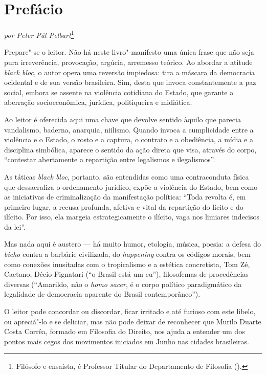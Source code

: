 \chapter{Prefácio}

\begin{flushright}
\emph{por Peter Pál Pelbart}\footnote{Filósofo e ensaísta, é
Professor Titular do Departamento de Filosofia ().}
\end{flushright}

Prepare"-se o leitor. Não há neste livro"-manifesto uma única frase que
não seja pura irreverência, provocação, argúcia, arremesso teórico. Ao
abordar a atitude \emph{black bloc}, o autor opera uma reversão
impiedosa: tira a máscara da democracia ocidental e de sua versão
brasileira. Sim, desta que invoca constantemente a paz social, embora se
assente na violência cotidiana do Estado, que garante a aberração
socioeconômica, jurídica, politiqueira e midiática.

Ao leitor é oferecida aqui uma chave que devolve sentido àquilo que
parecia vandalismo, baderna, anarquia, niilismo. Quando invoca a
cumplicidade entre a violência e o Estado, o rosto e a captura, o
contrato e a obediência, a mídia e a disciplina simbólica, aparece o
sentido da ação direta que visa, através do corpo, ``contestar
abertamente a repartição entre legalismos e ilegalismos''.

As táticas \emph{black bloc}, portanto, são entendidas como uma
contraconduta física que dessacraliza o ordenamento jurídico, expõe a
violência do Estado, bem como as iniciativas de criminalização da
manifestação política: ``Toda revolta é, em primeiro lugar, a recusa
profunda, afetiva e vital da repartição do lícito e do ilícito. Por
isso, ela margeia estrategicamente o ilícito, vaga nos limiares
indecisos da lei''.

Mas nada aqui é austero --- há muito humor, etologia, música, poesia: a
defesa do \emph{bicho} contra a barbárie civilizada, do \emph{happening}
contra os códigos morais, bem como conexões inusitadas com o
tropicalismo e a estética concretista, Tom Zé, Caetano, Décio Pignatari
(``o Brasil está um cu''), filosofemas de procedências diversas
(``Amarildo, não o \emph{homo sacer}, é o corpo político paradigmático
da legalidade de democracia aparente do Brasil contemporâneo'').

O leitor pode concordar ou discordar, ficar irritado e até furioso com
este libelo, ou apreciá"-lo e se deliciar, mas não pode deixar de
reconhecer que Murilo Duarte Costa Corrêa, formado em Filosofia do
Direito, nos ajuda a entender um dos pontos mais cegos dos movimentos
iniciados em Junho nas cidades brasileiras.

